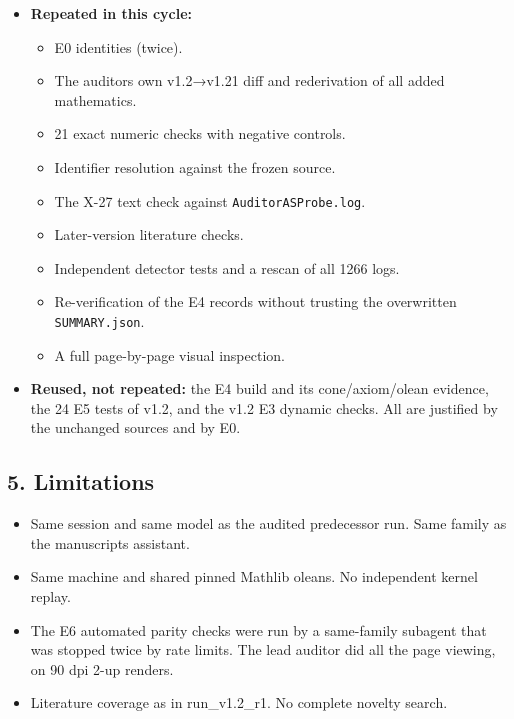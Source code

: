 \documentclass[
]{article}
\providecommand{\tightlist}{%
  \setlength{\itemsep}{0pt}\setlength{\parskip}{0pt}}
\begin{document}
\begin{itemize}
\tightlist
\item
  \textbf{Repeated in this cycle:}

  \begin{itemize}
  \tightlist
  \item
    E0 identities (twice).
  \item
    The auditor\textquotesingle s own v1.2→v1.21 diff and rederivation
    of all added mathematics.
  \item
    21 exact numeric checks with negative controls.
  \item
    Identifier resolution against the frozen source.
  \item
    The X-27 text check against \texttt{AuditorASProbe.log}.
  \item
    Later-version literature checks.
  \item
    Independent detector tests and a rescan of all 1266 logs.
  \item
    Re-verification of the E4 records without trusting the overwritten
    \texttt{SUMMARY.json}.
  \item
    A full page-by-page visual inspection.
  \end{itemize}
\item
  \textbf{Reused, not repeated:} the E4 build and its cone/axiom/olean
  evidence, the 24 E5 tests of v1.2, and the v1.2 E3 dynamic checks. All
  are justified by the unchanged sources and by E0.
\end{itemize}

\subsection{5. Limitations}\label{5-limitations}

\begin{itemize}
\tightlist
\item
  Same session and same model as the audited predecessor run. Same
  family as the manuscript\textquotesingle s assistant.
\item
  Same machine and shared pinned Mathlib oleans. No independent kernel
  replay.
\item
  The E6 automated parity checks were run by a same-family subagent that
  was stopped twice by rate limits. The lead auditor did all the page
  viewing, on 90 dpi 2-up renders.
\item
  Literature coverage as in run\_v1.2\_r1. No complete novelty search.
\end{itemize}
\end{document}
